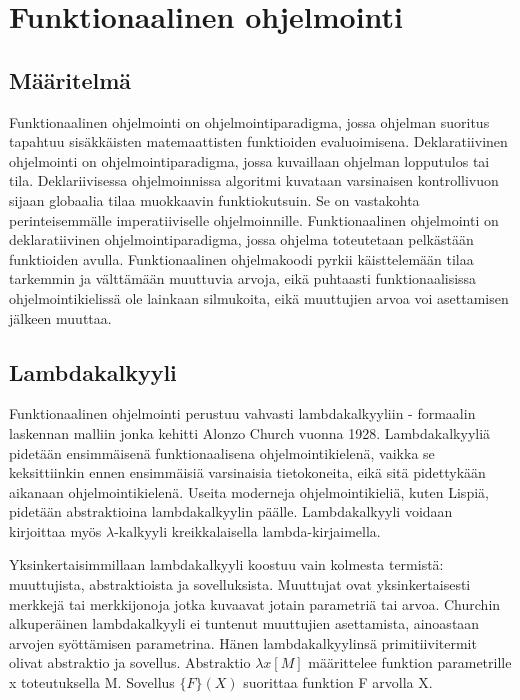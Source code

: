\chapter{Funktionaalinen ohjelmointi} \label{Funktionaalinen ohjelmointi}

\section{Määritelmä}
Funktionaalinen ohjelmointi on ohjelmointiparadigma, jossa ohjelman suoritus tapahtuu sisäkkäisten matemaattisten
funktioiden evaluoimisena. Deklaratiivinen ohjelmointi on ohjelmointiparadigma, jossa kuvaillaan ohjelman lopputulos
tai tila. Deklariivisessa ohjelmoinnissa algoritmi kuvataan varsinaisen kontrollivuon sijaan globaalia tilaa muokkaavin
funktiokutsuin. Se on vastakohta perinteisemmälle imperatiiviselle ohjelmoinnille. Funktionaalinen ohjelmointi on
deklaratiivinen ohjelmointiparadigma, jossa ohjelma toteutetaan pelkästään funktioiden avulla. Funktionaalinen
ohjelmakoodi pyrkii käisttelemään tilaa tarkemmin ja välttämään muuttuvia arvoja, eikä puhtaasti funktionaalisissa
ohjelmointikielissä ole lainkaan silmukoita, eikä muuttujien arvoa voi asettamisen jälkeen muuttaa.\cite{hudak}

\section{Lambdakalkyyli}
Funktionaalinen ohjelmointi perustuu vahvasti lambdakalkyyliin - formaalin laskennan malliin jonka kehitti Alonzo Church
vuonna 1928. Lambdakalkyyliä pidetään ensimmäisenä funktionaalisena ohjelmointikielenä, vaikka se keksittiinkin ennen
ensimmäisiä varsinaisia tietokoneita, eikä sitä pidettykään aikanaan ohjelmointikielenä. Useita moderneja
ohjelmointikieliä, kuten Lispiä, pidetään abstraktioina lambdakalkyylin päälle. Lambdakalkyyli voidaan kirjoittaa myös
$ \lambda $-kalkyyli kreikkalaisella lambda-kirjaimella.\cite{hudak}

Yksinkertaisimmillaan lambdakalkyyli koostuu vain kolmesta termistä: muuttujista, abstraktioista ja sovelluksista.
Muuttujat ovat yksinkertaisesti merkkejä tai merkkijonoja jotka kuvaavat jotain parametriä tai arvoa. Churchin
alkuperäinen lambdakalkyyli ei tuntenut muuttujien asettamista, ainoastaan arvojen syöttämisen parametrina. Hänen
lambdakalkyylinsä primitiivitermit olivat abstraktio ja sovellus. Abstraktio $ \lambda x [ M ] $ määrittelee funktion
parametrille x toteutuksella M. Sovellus $ \{ F \} ( X ) $ suorittaa funktion F arvolla X.\cite{lambdacalculus}

